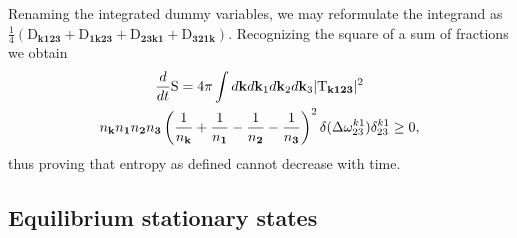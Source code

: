 Renaming the integrated dummy variables, we may reformulate the integrand as 
$\frac{1}{4} \left(\mathrm{D}_\mathbf{k123}+\mathrm{D}_\mathbf{1k23}+\mathrm{D}_\mathbf{23k1}+
\mathrm{D}_\mathbf{321k} \right)$. Recognizing the square of a sum of fractions we obtain
\begin{multline}
    \frac{d}{dt} \mathrm{S} = 4\pi \int d\mathbf{k} d\mathbf{k}_1 d\mathbf{k}_2 d\mathbf{k}_3 |\mathrm{T}_{\mathbf{k123}}|^2 \\n_\mathbf{k}n_\mathbf{1}n_\mathbf{2}n_\mathbf{3} 
     \left( \frac{1}{n_\mathbf{k}} + \frac{1}{n_\mathbf{1}}-\frac{1}{n_\mathbf{2}}-\frac{1}{n_\mathbf{3}}\right)^2 
    \delta(\Delta{\omega}^{k1}_{23})\delta^{k1}_{23}\ge 0,
\end{multline}
thus proving that entropy as defined cannot decrease with time. \\

\subsection{Equilibrium stationary states}

